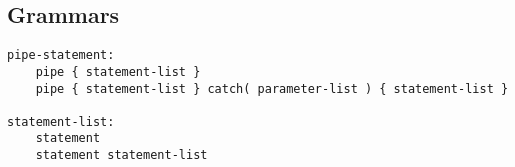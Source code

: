 \documentclass[./Report_main.tex]{subfiles}
\begin{document}
\begin{comment}
\subsection{And Then There Were Two}
Consider the terms \textit{pipelineX} to refer to a sequence of functions arranged in a pipeline as detailed in the section \textit{My First Pipeline}, where X is a number serving as a unique ID for
the pipeline. Now consider the two distinct pipelines, \textit{pipeline0} and \textit{pipeline1}. Both pipelines contain functions which are blocking, waiting for the results of an I/O operation. The two pipelines are arranged as such in code:
\begin{lstlisting}
pipeline0;
pipeline1;
\end{lstlisting}
Let's mimic the flow of a real program as it executes the two lines above. \textit{Pipeline0} is executed and runs until there is a blocking operation. As soon as a blocking operation is encountered,
the program moves it off of the main thread, and then on the main thread continues on to execute \textit{pipeline1}. The functions in pipeline1 will execute until one blocks, at which point this pipeline1 will also be queued and moved off the main thread. The main thread will continue executing any code after pipeline1. When the blocking function in pipeline0 or pipeline1 returns, the corresponding pipeline resumes execution.   


\subsection{Data and Pipelines}
If there is a blocking I/O operation, it must be put in a pipeline or the return value for the blocking function may be filled with junk or a null value, and this erroneous value could be used immediately if the next line makes use of the variable. Pipelines should be treated as islands of data, in that functions which depend on (take as arguments) values returned from blocking functions can only execute after the blocking function returns, which is unpredictable. In that sense, functions that are data dependent and relate to a particular instance or type of I/O operation should likely be encapsulated in a single pipeline. 
\end{comment}
\subsection{Grammars}
\begin{lstlisting}
pipe-statement:
	pipe { statement-list }
	pipe { statement-list } catch( parameter-list ) { statement-list }

statement-list:
    statement
    statement statement-list
\end{lstlisting}
\end{document}
